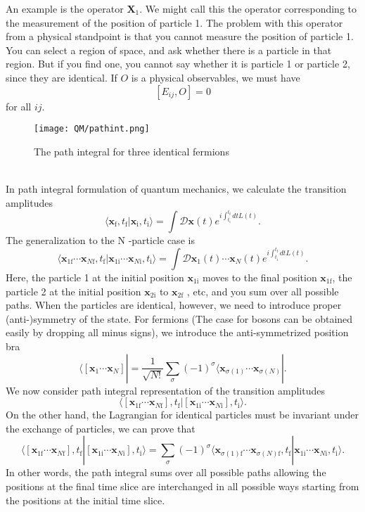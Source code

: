 An example is the operator $\bm{X}_1$. We might call this the operator corresponding to the measurement of the position of
particle 1. 
The problem with this operator from a physical standpoint is that you cannot measure the position of particle 1. You can select a region of space, and ask whether there is a particle in that region. But if you find one, you cannot say whether it is particle 1 or particle 2, since they are identical. 
If $O$ is a physical observables, we must have
\[[E_{ij},O] = 0\]
for all $ij$.
\begin{figure}[!h]
	\centering
	\texttt{[image: QM/pathint.png]}
	\caption{The path integral for three identical fermions}
\end{figure}\\
In path integral formulation of quantum mechanics, we calculate the transition amplitudes
\[\langle \bm{x}_{\mathrm{f}},t_{\mathrm{f}} | \bm{x}_{\mathrm{i}},t_{\mathrm{i}}\rangle = \int \mathcal{D}\bm{x}(t) e^{i\int_{t_{\mathrm{i}}}^{t_{\mathrm{f}}} dt L(t)}.\]
The generalization to the N -particle case is
\[\langle \bm{x}_{1\mathrm{f}}\cdots\bm{x}_{N\mathrm{f}},t_{\mathrm{f}} | \bm{x}_{1\mathrm{i}}\cdots\bm{x}_{N\mathrm{i}},t_{\mathrm{i}}\rangle = \int \mathcal{D}\bm{x}_1(t)\cdots\bm{x}_N(t) e^{i\int_{t_{\mathrm{i}}}^{t_{\mathrm{f}}} dt L(t)}.\]
Here, the particle 1 at the initial position $\bm{x}_{1\mathrm{i}}$ moves to the final position $\bm{x}_{1\mathrm{f}}$, the particle 2 at the initial position $\bm{x}_{2\mathrm{i}}$ to $\bm{x}_{2\mathrm{f}}$ , etc, and you sum over all possible paths.
When the particles are identical, however, we need to introduce proper (anti-)symmetry of the state. For fermions (The case for bosons can be obtained easily by dropping all minus signs), we introduce the anti-symmetrized position bra
\[\langle [\bm{x}_1\cdots\bm{x}_N]| = \frac{1}{\sqrt{N!}} \sum_{\sigma} (-1)^{\sigma} \langle \bm{x}_{\sigma(1)}\cdots\bm{x}_{\sigma(N)}|.\]
We now consider path integral representation of the transition amplitudes
\[\langle [\bm{x}_{1\mathrm{f}}\cdots\bm{x}_{N\mathrm{f}}],t_{\mathrm{f}} | [\bm{x}_{1\mathrm{i}}\cdots\bm{x}_{N\mathrm{i}}],t_{\mathrm{i}}\rangle.\]
On the other hand, the Lagrangian for identical particles must be invariant under the exchange of particles, we can prove that
\[\langle [\bm{x}_{1\mathrm{f}}\cdots\bm{x}_{N\mathrm{f}}],t_{\mathrm{f}} | [\bm{x}_{1\mathrm{i}}\cdots\bm{x}_{N\mathrm{i}}],t_{\mathrm{i}}\rangle = \sum_{\sigma} (-1)^{\sigma}  \langle \bm{x}_{\sigma(1)\mathrm{f}}\cdots\bm{x}_{\sigma(N)\mathrm{f}},t_{\mathrm{f}} | \bm{x}_{1\mathrm{i}}\cdots\bm{x}_{N\mathrm{i}},t_{\mathrm{i}}\rangle.\]
In other words, the path integral sums over all possible paths allowing the positions at the final time slice are interchanged in all possible ways starting from the positions at the initial time slice.

